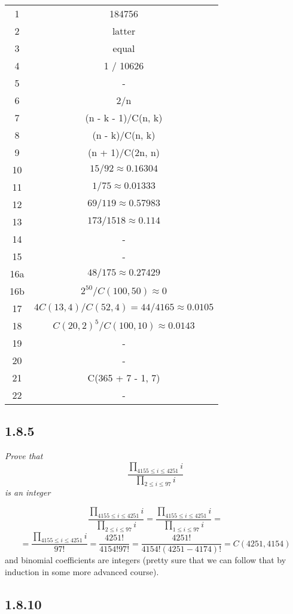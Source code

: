 \documentclass[11pt,oneside,titlepage]{book}
\begin{document}
\begin{tabular}[center]{||c | c|| }
  \hline
  1 & 184756 \\
  2 & latter \\
  3 & equal \\
  4 & 1 / 10626 \\
  5 & - \\
  6 & 2/n \\
  7 & (n - k - 1)/C(n, k) \\
  8 & (n - k)/C(n, k) \\
  9 & (n + 1)/C(2n, n)\\
  10 & $15/92 \approx 0.16304$ \\
  11 & $1 / 75 \approx 0.01333$ \\
  12 & $69 / 119 \approx 0.57983$ \\
  13 & $173 / 1518 \approx 0.114$ \\
  14 & - \\
  15 &  - \\
  16a & $48 / 175 \approx 0.27429$ \\
  16b & $2^{50}/C(100, 50) \approx 0$ \\
  17 & $4 C(13, 4)/ C(52, 4) = 44/ 4165 \approx 0.0105$\\
  18 & $C(20, 2)^5 / C(100, 10) \approx 0.0143$ \\
  19 & - \\
  20 & - \\
  21 & C(365 + 7 - 1, 7) \\
  22 & - \\
  \hline 
\end{tabular}


\subsection*{1.8.5}

\textit{Prove that
  $$ \frac{\prod_{4155 \leq i \leq 4251}{i}}{\prod_{2 \leq i \leq 97}{i}}$$
  is an integer}

$$\frac{\prod_{4155 \leq i \leq 4251}{i}}{\prod_{2 \leq i \leq 97}{i}} =
\frac{\prod_{4155 \leq i \leq 4251}{i}}{\prod_{1 \leq i \leq 97}{i}} = $$
$$ =  \frac{\prod_{4155 \leq i \leq 4251}{i}}{97!} =
\frac{4251!}{4154!97!} = \frac{4251!}{4154!(4251 - 4174)!} = C(4251, 4154)$$
and binomial coefficients are integers (pretty sure that we can follow that by induction
in some more advanced course).

\subsection*{1.8.10}
\end{document}
